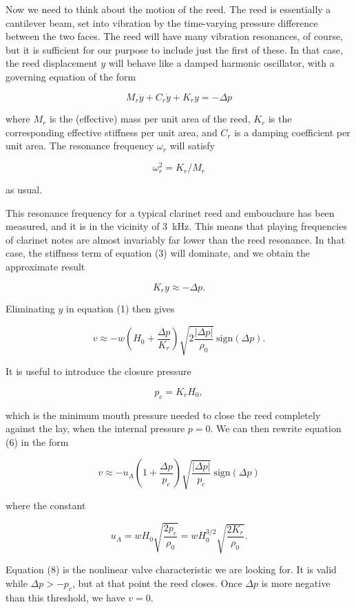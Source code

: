   Now we need to think about the motion of the reed. The reed is essentially a 
  cantilever beam, set into vibration by the time-varying pressure difference 
  between the two faces. The reed will have many vibration resonances, of 
  course, but it is sufficient for our purpose to include just the first of 
  these. In that case, the reed displacement $y$ will behave like a damped 
  harmonic oscillator, with a governing equation of the form 

  $$M_r \ddot{y} + C_r \dot{y} + K_r y=-\Delta p \tag{3}$$ 

  where $M_r$ is the (effective) mass per unit area of the reed, $K_r$ is the 
  corresponding effective stiffness per unit area, and $C_r$ is a damping 
  coefficient per unit area. The resonance frequency $\omega_r$ will satisfy 

  $$\omega_r^2=K_r/M_r \tag{4}$$ 

  as usual. 

  This resonance frequency for a typical clarinet reed and embouchure has been 
  measured, and it is in the vicinity of 3~kHz. This means that playing 
  frequencies of clarinet notes are almost invariably far lower than the reed 
  resonance. In that case, the stiffness term of equation (3) will dominate, 
  and we obtain the approximate result 

  $$K_r y \approx -\Delta p . \tag{5}$$ 

  Eliminating $y$ in equation (1) then gives 

  $$v \approx -w\left(H_0+ \dfrac{\Delta p}{K_r}\right) \sqrt{2 \dfrac{|\Delta 
  p|}{\rho_0}} \mathrm{~sign} (\Delta p) . \tag{6}$$ 

  It is useful to introduce the closure pressure 

  $$p_c=K_r H_0 , \tag{7}$$ 

  which is the minimum mouth pressure needed to close the reed completely 
  against the lay, when the internal pressure $p=0$. We can then rewrite 
  equation (6) in the form 

  $$v \approx -u_A\left(1+ \dfrac{\Delta p}{p_c}\right) \sqrt{\dfrac{|\Delta 
  p|}{p_c}} \mathrm{~sign} (\Delta p) \tag{8}$$ 

  where the constant 

  $$u_A = w H_0\sqrt{\dfrac{2 p_c}{\rho_0}} =w H_0^{3/2}\sqrt{\dfrac{2 
  K_r}{\rho_0}} . \tag{9}$$ 

  Equation (8) is the nonlinear valve characteristic we are looking for. It is 
  valid while $\Delta p > -p_c$, but at that point the reed closes. Once 
  $\Delta p$ is more negative than this threshold, we have $v=0$. 

